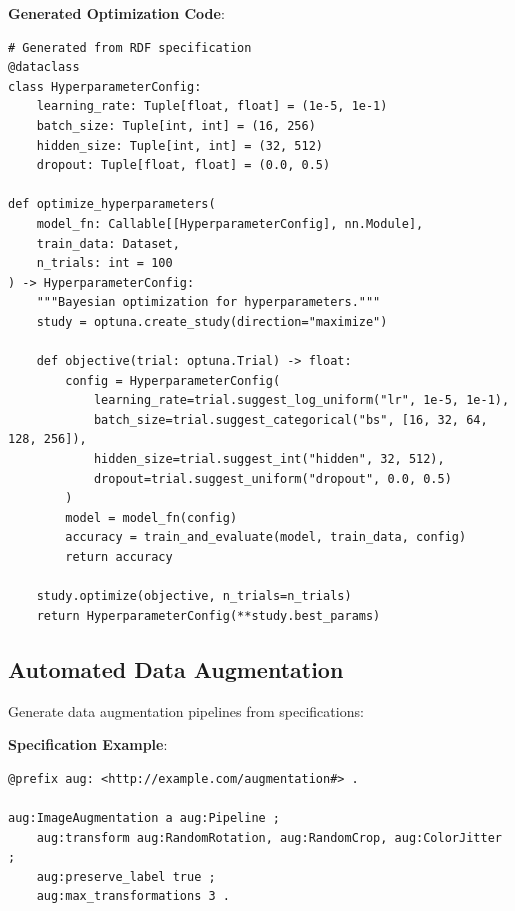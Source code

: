 \textbf{Generated Optimization Code}:

\begin{verbatim}
# Generated from RDF specification
@dataclass
class HyperparameterConfig:
    learning_rate: Tuple[float, float] = (1e-5, 1e-1)
    batch_size: Tuple[int, int] = (16, 256)
    hidden_size: Tuple[int, int] = (32, 512)
    dropout: Tuple[float, float] = (0.0, 0.5)

def optimize_hyperparameters(
    model_fn: Callable[[HyperparameterConfig], nn.Module],
    train_data: Dataset,
    n_trials: int = 100
) -> HyperparameterConfig:
    """Bayesian optimization for hyperparameters."""
    study = optuna.create_study(direction="maximize")

    def objective(trial: optuna.Trial) -> float:
        config = HyperparameterConfig(
            learning_rate=trial.suggest_log_uniform("lr", 1e-5, 1e-1),
            batch_size=trial.suggest_categorical("bs", [16, 32, 64, 128, 256]),
            hidden_size=trial.suggest_int("hidden", 32, 512),
            dropout=trial.suggest_uniform("dropout", 0.0, 0.5)
        )
        model = model_fn(config)
        accuracy = train_and_evaluate(model, train_data, config)
        return accuracy

    study.optimize(objective, n_trials=n_trials)
    return HyperparameterConfig(**study.best_params)
\end{verbatim}

\subsection{Automated Data Augmentation}

Generate data augmentation pipelines from specifications:

\begin{theorem}[Augmentation Correctness]}
    If augmentation specification $\mathcal{A}$ preserves label semantics, then:
    \begin{equation}
        \forall (x, y) \in \mathcal{D}: \text{label}(\mathcal{A}(x)) = \text{label}(x) = y
    \end{equation}
    Augmentation never changes the true label.
\end{theorem}

\textbf{Specification Example}:

\begin{verbatim}
@prefix aug: <http://example.com/augmentation#> .

aug:ImageAugmentation a aug:Pipeline ;
    aug:transform aug:RandomRotation, aug:RandomCrop, aug:ColorJitter ;
    aug:preserve_label true ;
    aug:max_transformations 3 .
\end{verbatim}

